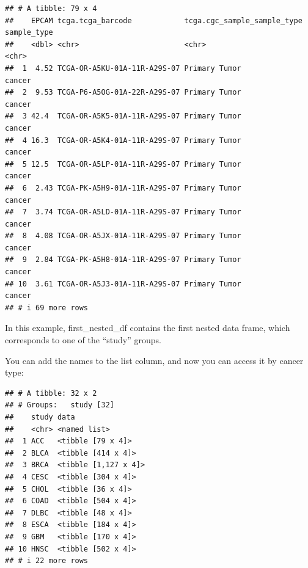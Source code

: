 \documentclass[
]{book}
\newenvironment{Shaded}{\begin{snugshade}}{\end{snugshade}}
\newcommand{\FunctionTok}[1]{\textcolor[rgb]{0.13,0.29,0.53}{\textbf{#1}}}
\newcommand{\NormalTok}[1]{#1}
\newcommand{\OtherTok}[1]{\textcolor[rgb]{0.56,0.35,0.01}{#1}}
\newcommand{\SpecialCharTok}[1]{\textcolor[rgb]{0.81,0.36,0.00}{\textbf{#1}}}
\newcommand{\StringTok}[1]{\textcolor[rgb]{0.31,0.60,0.02}{#1}}
\begin{document}
\begin{verbatim}
## # A tibble: 79 x 4
##    EPCAM tcga.tcga_barcode            tcga.cgc_sample_sample_type sample_type
##    <dbl> <chr>                        <chr>                       <chr>      
##  1  4.52 TCGA-OR-A5KU-01A-11R-A29S-07 Primary Tumor               cancer     
##  2  9.53 TCGA-P6-A5OG-01A-22R-A29S-07 Primary Tumor               cancer     
##  3 42.4  TCGA-OR-A5K5-01A-11R-A29S-07 Primary Tumor               cancer     
##  4 16.3  TCGA-OR-A5K4-01A-11R-A29S-07 Primary Tumor               cancer     
##  5 12.5  TCGA-OR-A5LP-01A-11R-A29S-07 Primary Tumor               cancer     
##  6  2.43 TCGA-PK-A5H9-01A-11R-A29S-07 Primary Tumor               cancer     
##  7  3.74 TCGA-OR-A5LD-01A-11R-A29S-07 Primary Tumor               cancer     
##  8  4.08 TCGA-OR-A5JX-01A-11R-A29S-07 Primary Tumor               cancer     
##  9  2.84 TCGA-PK-A5H8-01A-11R-A29S-07 Primary Tumor               cancer     
## 10  3.61 TCGA-OR-A5J3-01A-11R-A29S-07 Primary Tumor               cancer     
## # i 69 more rows
\end{verbatim}

In this example, first\_nested\_df contains the first nested data frame, which corresponds to one of the ``study'' groups.

You can add the names to the list column, and now you can access it by cancer type:

\begin{Shaded}
\end{Shaded}

\begin{verbatim}
## # A tibble: 32 x 2
## # Groups:   study [32]
##    study data                
##    <chr> <named list>        
##  1 ACC   <tibble [79 x 4]>   
##  2 BLCA  <tibble [414 x 4]>  
##  3 BRCA  <tibble [1,127 x 4]>
##  4 CESC  <tibble [304 x 4]>  
##  5 CHOL  <tibble [36 x 4]>   
##  6 COAD  <tibble [504 x 4]>  
##  7 DLBC  <tibble [48 x 4]>   
##  8 ESCA  <tibble [184 x 4]>  
##  9 GBM   <tibble [170 x 4]>  
## 10 HNSC  <tibble [502 x 4]>  
## # i 22 more rows
\end{verbatim}

\begin{Shaded}
\end{Shaded}
\end{document}
